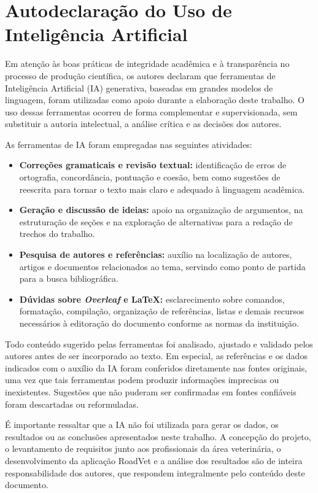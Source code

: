\chapter{Autodeclaração do Uso de Inteligência Artificial}
\label{cap:autodeclaracao-ia}

Em atenção às boas práticas de integridade acadêmica e à transparência no processo de produção científica, os autores declaram que ferramentas de Inteligência Artificial (IA) generativa, baseadas em grandes modelos de linguagem, foram utilizadas como apoio durante a elaboração deste trabalho. O uso dessas ferramentas ocorreu de forma complementar e supervisionada, sem substituir a autoria intelectual, a análise crítica e as decisões dos autores.

As ferramentas de IA foram empregadas nas seguintes atividades:

\begin{itemize}
    \renewcommand\labelitemi{-}
    \item \textbf{Correções gramaticais e revisão textual:} identificação de erros de ortografia, concordância, pontuação e coesão, bem como sugestões de reescrita para tornar o texto mais claro e adequado à linguagem acadêmica.
    \item \textbf{Geração e discussão de ideias:} apoio na organização de argumentos, na estruturação de seções e na exploração de alternativas para a redação de trechos do trabalho.
    \item \textbf{Pesquisa de autores e referências:} auxílio na localização de autores, artigos e documentos relacionados ao tema, servindo como ponto de partida para a busca bibliográfica.
    \item \textbf{Dúvidas sobre \textit{Overleaf} e \LaTeX:} esclarecimento sobre comandos, formatação, compilação, organização de referências, listas e demais recursos necessários à editoração do documento conforme as normas da instituição.
\end{itemize}

Todo conteúdo sugerido pelas ferramentas foi analisado, ajustado e validado pelos autores antes de ser incorporado ao texto. Em especial, as referências e os dados indicados com o auxílio da IA foram conferidos diretamente nas fontes originais, uma vez que tais ferramentas podem produzir informações imprecisas ou inexistentes. Sugestões que não puderam ser confirmadas em fontes confiáveis foram descartadas ou reformuladas.

É importante ressaltar que a IA não foi utilizada para gerar os dados, os resultados ou as conclusões apresentados neste trabalho. A concepção do projeto, o levantamento de requisitos junto aos profissionais da área veterinária, o desenvolvimento da aplicação RoadVet e a análise dos resultados são de inteira responsabilidade dos autores, que respondem integralmente pelo conteúdo deste documento.
